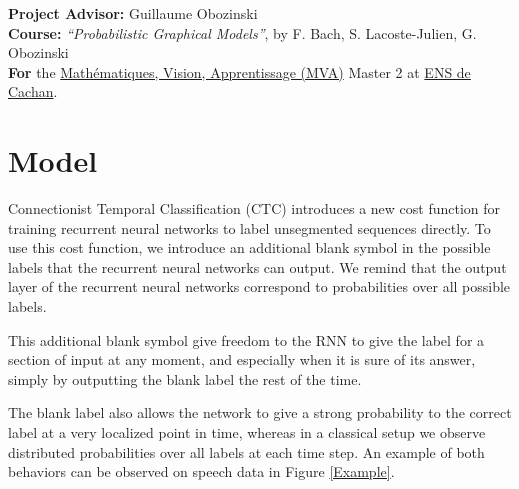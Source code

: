 \documentclass[11pt,a4paper]{article}
\providecommand*{\hr}[1][class-arg]{%
    \hspace*{\fill}\hrulefill\hspace*{\fill}
    \vskip 0.65\baselineskip
}
\begin{document}
\vspace{1em}

\hr{}  %


\vspace{1em}

\begin{center}
        \textbf{Project Advisor:} Guillaume Obozinski \\
        \textbf{Course:}
        \emph{``Probabilistic Graphical Models''}, by F. Bach, S. Lacoste-Julien, G. Obozinski \\
        \textbf{For} the \href{http://www.math.ens-cachan.fr/version-anglaise/academics/mva-master-degree-227777.kjsp}{Math\'ematiques, Vision, Apprentissage (MVA)} Master 2
        at \href{http://www.ens-cachan.fr/}{ENS de Cachan}.
\end{center}


\newpage

\section{Model}

Connectionist Temporal Classification (CTC) introduces a new cost function for training recurrent neural networks to label unsegmented sequences directly.
To use this cost function, we introduce an additional blank symbol in the possible labels that the recurrent neural networks can output. We remind that the output layer of the recurrent neural networks correspond to probabilities over all possible labels.

This additional blank symbol give freedom to the RNN to give the label for a section of input at any moment, and especially when it is sure of its answer, simply by outputting the blank label the rest of the time.

The blank label also allows the network to give a strong probability to the correct label at a very localized point in time, whereas in a classical setup we observe distributed probabilities over all labels at each time step. An example of both behaviors can be observed on speech data in Figure \ref{Example}.
\end{document}
